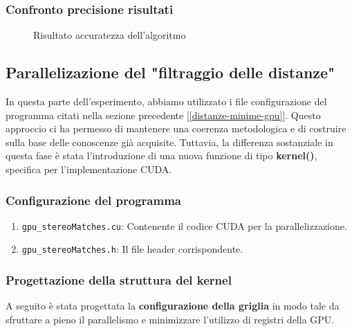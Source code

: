 \documentclass[12pt,a4paper]{report}
\begin{document}
\subsubsection{Confronto precisione risultati}

\begin{figure}[H]
    \centering
    \caption{Risultato accuratezza dell'algoritmo}
\end{figure}

\subsection{Parallelizazione del "filtraggio delle distanze" }

In questa parte dell'esperimento, abbiamo utilizzato i file configurazione del programma citati nella sezione precedente [\ref{distanze-minime-gpu}]. Questo approccio ci ha permesso di mantenere una coerenza metodologica e di costruire sulla base delle conoscenze già acquisite. Tuttavia, la differenza sostanziale in questa fase è stata l'introduzione di una nuova funzione di tipo \textbf{kernel()}, specifica per l'implementazione CUDA.
\subsubsection{Configurazione del programma}

\begin{enumerate}
    \item \texttt{gpu\_stereoMatches.cu}: Contenente il codice CUDA per la parallelizzazione.
    \item \texttt{gpu\_stereoMatches.h}: Il file header corrispondente.
\end{enumerate}

\vspace{1cm}

\subsubsection{Progettazione della struttura del kernel}

A seguito è stata progettata la \textbf{configurazione della griglia} in modo tale da sfruttare
a pieno il parallelismo e minimizzare l'utilizzo di registri della GPU.
\end{document}
